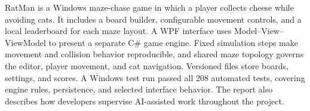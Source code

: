 RatMan is a Windows maze-chase game in which a player collects cheese while avoiding cats. It includes a board builder, configurable movement controls, and a local leaderboard for each maze layout. A WPF interface uses Model--View--ViewModel to present a separate C\# game engine. Fixed simulation steps make movement and collision behavior reproducible, and shared maze topology governs the editor, player movement, and cat navigation. Versioned files store boards, settings, and scores. A Windows test run passed all 208 automated tests, covering engine rules, persistence, and selected interface behavior. The report also describes how developers supervise AI-assisted work throughout the project.
